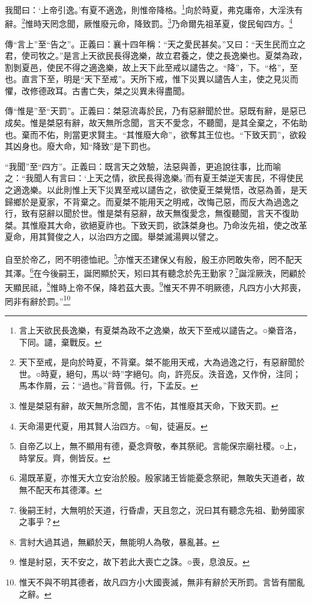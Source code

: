 我聞曰：‘上帝引逸。’有夏不適逸，則惟帝降格。\footnote{言上天欲民長逸樂，有夏桀為政不之逸樂，故天下至戒以譴告之。○樂音洛，下同。譴，棄戰反。}向於時夏，弗克庸帝，大淫泆有辭。\footnote{天下至戒，是向於時夏，不背棄。桀不能用天戒，大為過逸之行，有惡辭聞於世。○時夏，絕句，馬以“時”字絕句。向，許亮反。泆音逸，又作佾，注同；馬本作屑，云：“過也。”背音佩。行，下孟反。}惟時天罔念聞，厥惟廢元命，降致罰。\footnote{惟是桀惡有辭，故天無所念聞，言不佑，其惟廢其天命，下致天罰。}乃命爾先祖革夏，俊民甸四方。\footnote{天命湯更代夏，用其賢人治四方。○甸，徒遍反。}


{\noindent\zhuan{}\fzbyks 傳“言上”至“告之”。正義曰：襄十四年稱：“天之愛民甚矣。”又曰：“天生民而立之君，使司牧之。”是言上天欲民長得逸樂，故立君養之，使之長逸樂也。夏桀為政，割剝夏邑，使民不得之適逸樂，故上天下此至戒以譴告之。“降”，下。“格”，至也。直言下至，明是“天下至戒”。天所下戒，惟下災異以譴告人主，使之見災而懼，改修德政耳。古書亡失，桀之災異未得盡聞。 \par}

{\noindent\zhuan{}\fzbyks 傳“惟是”至“天罰”。正義曰：桀惡流毒於民，乃有惡辭聞於世。惡既有辭，是惡已成矣。惟是桀惡有辭，故天無所念聞，言天不愛念，不聽聞，是其全棄之，不佑助也。棄而不佑，則當更求賢主。“其惟廢大命”，欲奪其王位也。“下致天罰”，欲殺其凶身也。廢大命，知“降致”是下罰也。 \par}

{\noindent\shu{}\fzkt “我聞”至“四方”。正義曰：既言天之效驗，法惡與善，更追說往事，比而喻之：“我聞人有言曰：‘上天之情，欲民長得逸樂。’而有夏王桀逆天害民，不得使民之適逸樂。以此則惟上天下災異至戒以譴告之，欲使夏王桀覺悟，改惡為善，是天歸鄉於是夏家，不背棄之。而夏桀不能用天之明戒，改悔己惡，而反大為過逸之行，致有惡辭以聞於世。惟是桀有惡辭，故天無復愛念，無復聽聞，言天不復助桀。其惟廢其大命，欲絕夏祚也。下致天罰，欲誅桀身也。乃命汝先祖，使之改革夏命，用其賢俊之人，以治四方之國。舉桀滅湯興以譬之。 \par}

自至於帝乙，罔不明德恤祀。\footnote{自帝乙以上，無不顯用有德，憂念齊敬，奉其祭祀。言能保宗廟社稷。○上，時掌反。齊，側皆反。}亦惟天丕建保乂有殷，殷王亦罔敢失帝，罔不配天其澤。\footnote{湯既革夏，亦惟天大立安治於殷。殷家諸王皆能憂念祭祀，無敢失天道者，故無不配天布其德澤。}在今後嗣王，誕罔顯於天，矧曰其有聽念於先王勤家？\footnote{後嗣王紂，大無明於天道，行昏虐，天且忽之，況曰其有聽念先祖、勤勞國家之事乎？}誕淫厥泆，罔顧於天顯民祗，\footnote{言紂大過其過，無顧於天，無能明人為敬，暴亂甚。}惟時上帝不保，降若茲大喪。\footnote{惟是紂惡，天不安之，故下若此大喪亡之誅。○喪，息浪反。}惟天不畀不明厥德，凡四方小大邦喪，罔非有辭於罰。”\footnote{惟天不與不明其德者，故凡四方小大國喪滅，無非有辭於天所罰。言皆有闇亂之辭。}


